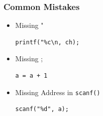 \begin{frame}[fragile]
\frametitle{Common Mistakes}

\begin{itemize}[<+->]
\item Missing "
\begin{lstlisting}[style=basicc,numbers=none]
printf("%c\n, ch);
\end{lstlisting}

\item Missing ;
\begin{lstlisting}[style=basicc,numbers=none]
a = a + 1
\end{lstlisting}

\item Missing Address in {\tt scanf()}
\begin{lstlisting}[style=basicc,numbers=none]
scanf("%d", a);
\end{lstlisting}
\end{itemize}
\end{frame}

